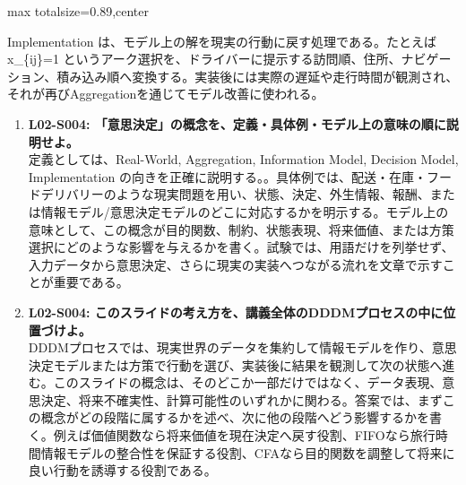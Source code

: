 \begin{minipage}[t]{0.58\textwidth}
\begin{adjustbox}{max totalsize={\textwidth}{0.89\textheight},center}
\begin{minipage}{\textwidth}
Implementation は、モデル上の解を現実の行動に戻す処理である。たとえば x\_\{ij\}=1 というアーク選択を、ドライバーに提示する訪問順、住所、ナビゲーション、積み込み順へ変換する。実装後には実際の遅延や走行時間が観測され、それが再びAggregationを通じてモデル改善に使われる。\par{}\begin{enumerate}\item \textbf{L02-S004: 「意思決定」の概念を、定義・具体例・モデル上の意味の順に説明せよ。}\\定義としては、Real-World, Aggregation, Information Model, Decision Model, Implementation の向きを正確に説明する。。具体例では、配送・在庫・フードデリバリーのような現実問題を用い、状態、決定、外生情報、報酬、または情報モデル/意思決定モデルのどこに対応するかを明示する。モデル上の意味として、この概念が目的関数、制約、状態表現、将来価値、または方策選択にどのような影響を与えるかを書く。試験では、用語だけを列挙せず、入力データから意思決定、さらに現実の実装へつながる流れを文章で示すことが重要である。\item \textbf{L02-S004: このスライドの考え方を、講義全体のDDDMプロセスの中に位置づけよ。}\\DDDMプロセスでは、現実世界のデータを集約して情報モデルを作り、意思決定モデルまたは方策で行動を選び、実装後に結果を観測して次の状態へ進む。このスライドの概念は、そのどこか一部だけではなく、データ表現、意思決定、将来不確実性、計算可能性のいずれかに関わる。答案では、まずこの概念がどの段階に属するかを述べ、次に他の段階へどう影響するかを書く。例えば価値関数なら将来価値を現在決定へ戻す役割、FIFOなら旅行時間情報モデルの整合性を保証する役割、CFAなら目的関数を調整して将来に良い行動を誘導する役割である。\end{enumerate}
\end{minipage}
\end{adjustbox}
\end{minipage}


